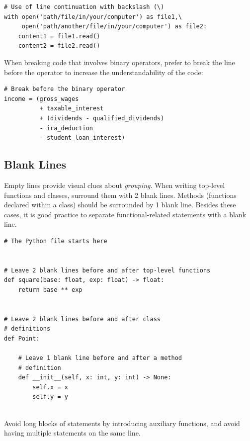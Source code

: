 \documentclass{tufte-handout}
\begin{document}
\begin{mdframed}
\begin{verbatim}
# Use of line continuation with backslash (\)
with open('path/file/in/your/computer') as file1,\
     open('path/another/file/in/your/computer') as file2:
    content1 = file1.read()
    content2 = file2.read()
\end{verbatim}
\end{mdframed}

When breaking code that involves binary operators, prefer to break the line before the operator to increase the understandability of the code:

\begin{mdframed}
\begin{verbatim}
# Break before the binary operator
income = (gross_wages
          + taxable_interest
          + (dividends - qualified_dividends)
          - ira_deduction
          - student_loan_interest)
\end{verbatim}
\end{mdframed}

\subsection{Blank Lines}

Empty lines provide visual clues about \emph{grouping}.
When writing top-level functions and classes, surround them with 2 blank lines.
Methods (functions declared within a class) should be surrounded by 1 blank line.	
Besides these cases, it is good practice to separate functional-related statements with a blank line.

\begin{mdframed}
\begin{verbatim}
# The Python file starts here


# Leave 2 blank lines before and after top-level functions
def square(base: float, exp: float) -> float:
    return base ** exp


# Leave 2 blank lines before and after class 
# definitions
def Point:
	
	# Leave 1 blank line before and after a method 
	# definition	
	def __init__(self, x: int, y: int) -> None:
	    self.x = x
	    self.y = y
     
\end{verbatim}
\end{mdframed}

Avoid long blocks of statements by introducing auxiliary functions, and avoid having multiple statements on the same line.
\end{document}
